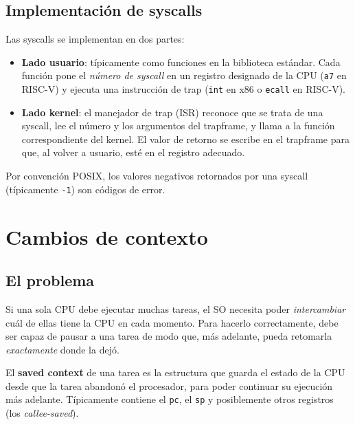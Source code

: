 \documentclass[11pt,a4paper]{article}
\begin{document}
\subsection{Implementación de syscalls}

Las syscalls se implementan en dos partes:

\begin{itemize}[leftmargin=*]
    \item \textbf{Lado usuario}: típicamente como funciones en la
        biblioteca estándar. Cada función pone el \emph{número de
        syscall} en un registro designado de la CPU (\texttt{a7} en
        RISC-V) y ejecuta una instrucción de trap (\texttt{int} en
        x86 o \texttt{ecall} en RISC-V).
    \item \textbf{Lado kernel}: el manejador de trap (ISR) reconoce
        que se trata de una syscall, lee el número y los argumentos
        del trapframe, y llama a la función correspondiente del
        kernel. El valor de retorno se escribe en el trapframe para
        que, al volver a usuario, esté en el registro adecuado.
\end{itemize}

Por convención POSIX, los valores negativos retornados por una
syscall (típicamente \texttt{-1}) son códigos de error.

\section{Cambios de contexto}

\subsection{El problema}

Si una sola CPU debe ejecutar muchas tareas, el SO necesita poder
\emph{intercambiar} cuál de ellas tiene la CPU en cada momento. Para
hacerlo correctamente, debe ser capaz de pausar a una tarea de modo
que, más adelante, pueda retomarla \emph{exactamente} donde la dejó.

\begin{definicion}
El \textbf{saved context} de una tarea es la estructura que guarda el
estado de la CPU desde que la tarea abandonó el procesador, para
poder continuar su ejecución más adelante. Típicamente contiene el
\texttt{pc}, el \texttt{sp} y posiblemente otros registros (los
\emph{callee-saved}).
\end{definicion}
\end{document}
